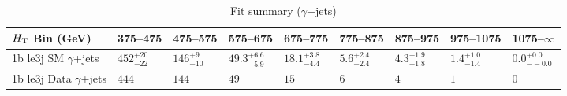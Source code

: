 \documentclass[8pt]{article}
\def\scalht{\mbox{$H_{\rm{T}}$}\xspace}
\newcommand\T{\rule{0pt}{2.6ex}}
\begin{document}
\begin{table}[ht!]
\caption{Fit summary ($\gamma$+jets)}
\label{tab:ensemble-summary}
\centering
\begin{tabular}{ lllllllll }

\hline
\scalht Bin (GeV)       & 375--475                       & 475--575                       & 575--675                       & 675--775                       & 775--875                       & 875--975                       & 975--1075                      & 1075--$\infty$                 \\ [1.000000ex]
\hline
1b le3j SM $\gamma$+jets\T & $452^{+20}_{-22}$              & $146^{+9}_{-10}$               & $49.3^{+6.6}_{-5.9}$           & $18.1^{+3.8}_{-4.4}$           & $5.6^{+2.4}_{-2.4}$            & $4.3^{+1.9}_{-1.8}$            & $1.4^{+1.0}_{-1.4}$            & $0.0^{+0.0}_{--0.0}$           \\ 
1b le3j Data $\gamma$+jets\T & $444$                          & $144$                          & $49$                           & $15$                           & $6$                            & $4$                            & $1$                            & $0$                            \\ 
\hline

\end{tabular}
\end{table}
\end{document}
